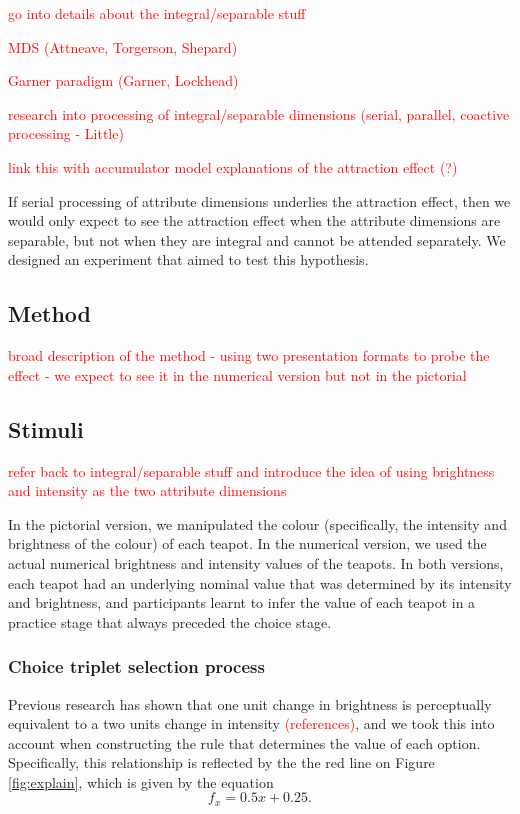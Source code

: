 \documentclass[11pt,a4paper]{article}
\begin{document}
\textcolor{red}{go into details about the integral/separable stuff }

\textcolor{red}{MDS (Attneave, Torgerson, Shepard)}

\textcolor{red}{Garner paradigm (Garner, Lockhead)}

\textcolor{red}{research into processing of integral/separable dimensions (serial, parallel, coactive processing - Little) }

\textcolor{red}{link this with accumulator model explanations of the attraction effect (?)}

If serial processing of attribute dimensions underlies the attraction effect, then we  would only expect to see the attraction effect when the attribute dimensions are separable, but not when they are integral and cannot be attended separately. We designed an experiment that aimed to test this hypothesis.


\subsection{Method}

\textcolor{red}{broad description of the method - using two presentation formats to probe the effect - we expect to see it in the numerical version but not in the pictorial}

\subsection{Stimuli}


\textcolor{red}{refer back to integral/separable stuff and introduce the idea of using brightness and intensity as the two attribute dimensions}


In the pictorial version, we manipulated the colour (specifically, the intensity and brightness of the colour) of each teapot. In the numerical version, we used the actual numerical brightness and intensity values of the teapots. In both versions, each teapot had an underlying nominal value that was determined by its intensity and brightness, and participants learnt to infer the value of each teapot in a practice stage that always preceded the choice stage. 

\subsubsection{Choice triplet selection process}


Previous research has shown that one unit change in brightness is perceptually equivalent to a two units change in intensity \textcolor{red} {(references)}, and we took this into account when constructing the rule that determines the value of each option. Specifically, this relationship is reflected by the the red line on Figure \ref{fig:explain}, which is given by the equation
\begin{equation} \label{eq:redline}
 f_{x} = 0.5x + 0.25.
\end{equation}
\end{document}
